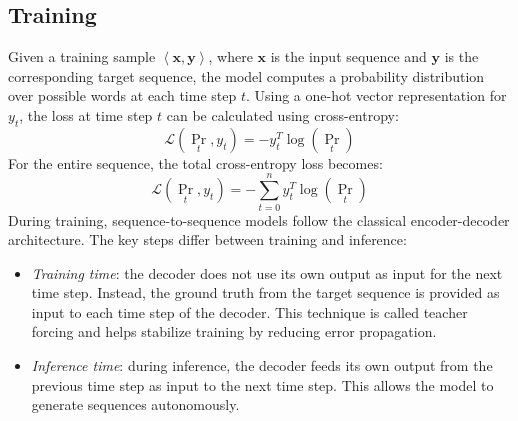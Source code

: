 \subsection{Training}
Given a training sample $\left\langle \mathbf{x},\mathbf{y}\right\rangle$, where $\mathbf{x}$ is the input sequence and $\mathbf{y}$ is the corresponding target sequence, the model computes a probability distribution over possible words at each time step $t$.
Using a one-hot vector representation for $y_t$, the loss at time step $t$ can be calculated using cross-entropy:
\[\mathcal{L}(\Pr_t,y_t)=-y_t^T\log(\Pr_t)\]
For the entire sequence, the total cross-entropy loss becomes:
\[\mathcal{L}(\Pr_t,y_t)=-\sum_{t=0}^ny_t^T\log(\Pr_t)\]
During training, sequence-to-sequence models follow the classical encoder-decoder architecture. 
The key steps differ between training and inference:
\begin{itemize}
    \item \textit{Training time}: the decoder does not use its own output as input for the next time step. 
        Instead, the ground truth from the target sequence is provided as input to each time step of the decoder. 
        This technique is called teacher forcing and helps stabilize training by reducing error propagation.
    \item \textit{Inference time}: during inference, the decoder feeds its own output from the previous time step as input to the next time step. 
        This allows the model to generate sequences autonomously.
\end{itemize}

